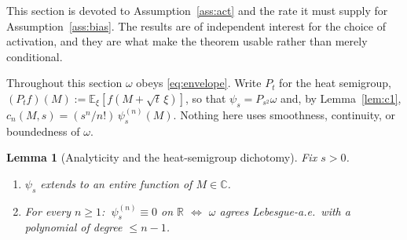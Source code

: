 \documentclass[11pt]{article}
\newtheorem{lemma}{Lemma}
\theoremstyle{remark}
\newcommand{\E}{\mathbb{E}}
\newcommand{\R}{\mathbb{R}}
\begin{document}
This section is devoted to Assumption~\ref{ass:act} and the rate it must supply for Assumption~\ref{ass:bias}. The results are of independent interest for the choice of activation, and they are what make the theorem usable rather than merely conditional.

Throughout this section $\omega$ obeys \eqref{eq:envelope}. Write $P_t$ for the heat semigroup, $(P_tf)(M) := \E_\xi[f(M + \sqrt t\,\xi)]$, so that $\psi_s = P_{s^2}\omega$ and, by Lemma~\ref{lem:c1}, $c_n(M,s) = (s^n/n!)\,\psi_s^{(n)}(M)$. Nothing here uses smoothness, continuity, or boundedness of $\omega$.

\begin{lemma}[Analyticity and the heat-semigroup dichotomy]\label{lem:dichotomy}
Fix $s > 0$.
\begin{enumerate}
\item[(a)] $\psi_s$ extends to an entire function of $M \in \mathbb C$.
\item[(b)] For every $n \ge 1$: $\ \psi_s^{(n)} \equiv 0$ on $\R$ $\iff$ $\omega$ agrees Lebesgue-a.e.\ with a polynomial of degree $\le n-1$.
\end{enumerate}
\end{lemma}
\end{document}
